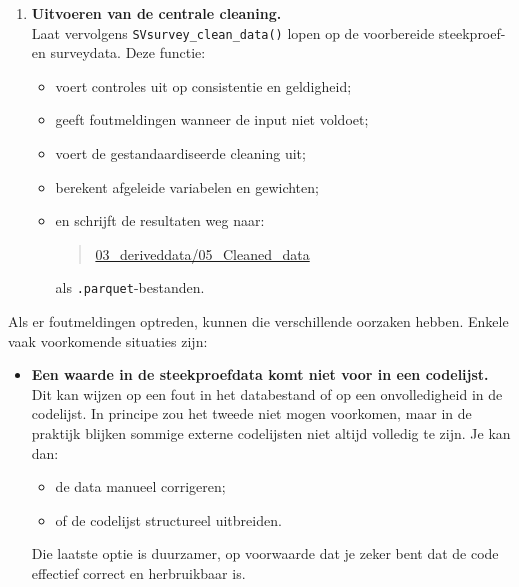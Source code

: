 \documentclass{VSAnote}
\begin{document}
\begin{enumerate}
\begin{enumerate}
\begin{itemize}
\item ook hier enkel de variabelen behouden blijven die nodig zijn voor de cleaning;
\item ook hier alle variabelen voldoen aan de evaluatiecriteria uit de DSD.
\end{itemize}

\item \textbf{Uitvoeren van de centrale cleaning.}\\
Laat vervolgens \verb+SVsurvey_clean_data()+ lopen op de voorbereide steekproef- en surveydata. Deze functie:
\begin{itemize}
\item voert controles uit op consistentie en geldigheid;
\item geeft foutmeldingen wanneer de input niet voldoet;
\item voert de gestandaardiseerde cleaning uit;
\item berekent afgeleide variabelen en gewichten;
\item en schrijft de resultaten weg naar:
\begin{quote}
\url{03_deriveddata/05_Cleaned_data}
\end{quote}
als \texttt{.parquet}-bestanden.
\end{itemize}

\end{enumerate}

Als er foutmeldingen optreden, kunnen die verschillende oorzaken hebben. Enkele vaak voorkomende situaties zijn:

\begin{itemize}

\item \textbf{Een waarde in de steekproefdata komt niet voor in een codelijst.}\\
Dit kan wijzen op een fout in het databestand of op een onvolledigheid in de codelijst. In principe zou het tweede niet mogen voorkomen, maar in de praktijk blijken sommige externe codelijsten niet altijd volledig te zijn. Je kan dan:
\begin{itemize}[nosep]
\item de data manueel corrigeren;
\item of de codelijst structureel uitbreiden.
\end{itemize}
Die laatste optie is duurzamer, op voorwaarde dat je zeker bent dat de code effectief correct en herbruikbaar is.


\end{itemize}
\end{enumerate}
\end{document}
